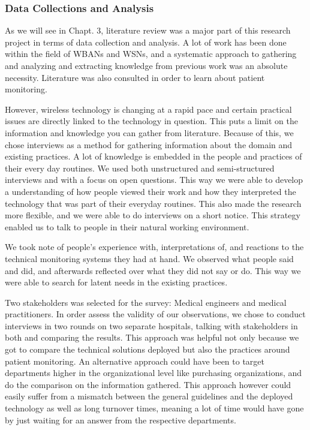 
\subsubsection{Data Collections and Analysis} %
\label{ssub:data_collections_and_analysis}

As we will see in Chapt. 3, literature review was a major part of this research project in terms of data collection and analysis. A lot of work has been done within the field of WBANs and WSNs, and a systematic approach to gathering and analyzing and extracting knowledge from previous work was an absolute necessity. Literature was also consulted in order to learn about patient monitoring.

However, wireless technology is changing at a rapid pace and certain practical issues are directly linked to the technology in question. This puts a limit on the information and knowledge you can gather from literature. Because of this, we chose interviews as a method for gathering information about the domain and existing practices. A lot of knowledge is embedded in the people and practices of their every day routines. We used both unstructured and semi-structured interviews and with a focus on open questions. This way we were able to develop a understanding of how people viewed their work and how they interpreted the technology that was part of their everyday routines. This also made the research more flexible, and we were able to do interviews on a short notice. This strategy enabled us to talk to people in their natural working environment.

We took note of people's experience with, interpretations of, and reactions to the technical monitoring systems they had at hand. We observed what people said and did, and afterwards reflected over what they did not say or do. This way we were able to search for latent needs in the existing practices. 

Two stakeholders was selected for the survey: Medical engineers and medical practitioners. In order assess the validity of our observations, we chose to conduct interviews in two rounds on two separate hospitals, talking with stakeholders in both and comparing the results. This approach was helpful not only because we got to compare the technical solutions deployed but also the practices around patient monitoring. An alternative approach could have been to target departments higher in the organizational level like purchasing organizations, and do the comparison on the information gathered. This approach however could easily suffer from a mismatch between the general guidelines and the deployed technology as well as long turnover times, meaning a lot of time would have gone by just waiting for an answer from the respective departments.




